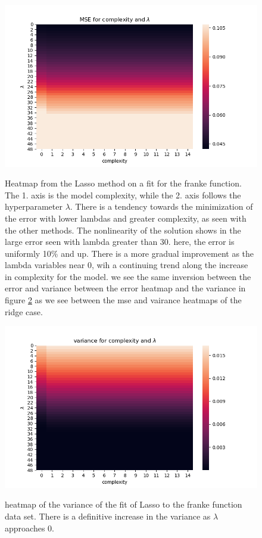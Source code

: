 \documentclass[ 12pt, a4paper ]{article}
\begin{document}
\begin{figure}
\includegraphics[scale=0.7]{frankelassomseheatmap.png}
\label{fig:frankelassomseheatmap}
\caption{
    Heatmap from the Lasso method on a fit for the franke function. The 1. axis is the model
    complexity, while the 2. axis follows the hyperparameter $\lambda$. There is a tendency
    towards the minimization of the error with lower lambdas and greater complexity, as seen
    with the other methods. The nonlinearity of the solution shows in the large error seen
    with lambda greater than 30. here, the error is uniformly 10\% and up. There is a more 
    gradual improvement as the lambda variables near 0, wih a continuing trend along the increase
    in complexity for the model. we see the same inversion between the error and variance between
    the error heatmap and the variance in figure \ref{fig:frankelassovarianceheatmap} as we see
    between the mse and vairance heatmaps of the ridge case. 
}
\end{figure}

\begin{figure}
\includegraphics[scale=0.7]{frankelassovarianceheatmap.png}
\label{fig:frankelassovarianceheatmap}
\caption{
    heatmap of the variance of the fit of Lasso to the franke function data set. There is 
    a definitive increase in the variance as $\lambda$ approaches 0. 
}
\end{figure}
\end{document}

